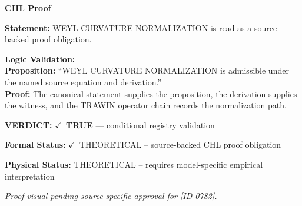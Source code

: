 \vspace{0.45em}
\noindent\textbf{CHL Proof}\par
\textbf{Statement:} WEYL CURVATURE NORMALIZATION is read as a source-backed proof obligation.

\textbf{Logic Validation:}\\
\textbf{Proposition:} ``WEYL CURVATURE NORMALIZATION is admissible under the named source equation and derivation.''\\
\textbf{Proof:} The canonical statement supplies the proposition, the derivation supplies the witness, and the TRAWIN operator chain records the normalization path.

\textbf{VERDICT:} \ensuremath{\checkmark}\ \textbf{TRUE} --- conditional registry validation

\textbf{Formal Status:} \ensuremath{\checkmark}\ THEORETICAL -- source-backed CHL proof obligation

\textbf{Physical Status:} THEORETICAL -- requires model-specific empirical interpretation
\par\vspace{0.45em}
\par
\vfill
\begingroup\footnotesize\itshape
Proof visual pending source-specific approval for [ID 0782].
\par\endgroup
\vfill
\endgroup
\endgroup
